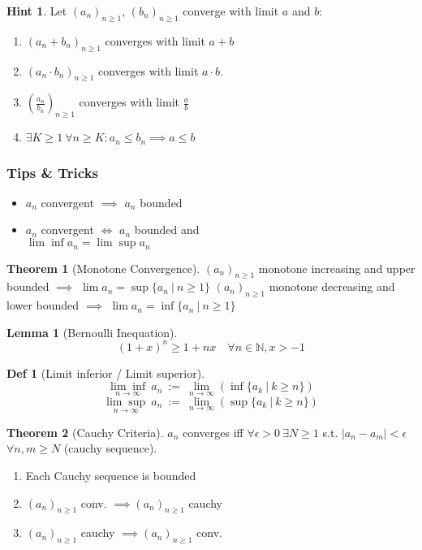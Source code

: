 \documentclass[a4paper, 10pt]{article}
\newtheorem*{lemma}{Lemma}
\theoremstyle{definition}
\newtheorem*{definition}{Def}
\newtheorem*{note_wrapper}{Hint}
\theoremstyle{ex}
\theoremstyle{named}
\newtheorem*{ntheorem_wrapper}{Theorem}
\newenvironment{ntheorem}%
    {\begin{mdframed}[style=important]\begin{ntheorem_wrapper}}%
    {\end{ntheorem_wrapper}\end{mdframed}}
\newenvironment{note}%
    {\begin{mdframed}[style=trick]\begin{note_wrapper}}%
    {\end{note_wrapper}\end{mdframed}}
\newcommand{\N}{\mathbb{N}}
\begin{document}
\begin{note}
    Let $(a_n)_{n\geq1}$, $(b_n)_{n\geq1}$ converge with limit $a$ and $b$:
    \begin{enumerate}
        \item $(a_n + b_n)_{n\geq1}$ converges with limit $a + b$
        \item $(a_n \cdot b_n)_{n\geq1}$ converges with limit $a \cdot b$.
        \item $(\frac{a_n}{b_n})_{n\geq1}$ converges with limit $\frac{a}{b}$
        \item $\exists K \geq 1 \ \forall n \geq K: a_n \leq b_n \implies a \leq b$
    \end{enumerate}
\end{note}

\subsubsection{Tips \& Tricks}
\begin{itemize}
    \item $a_n$ convergent $\implies$ $a_n$ bounded
    \item $a_n$ convergent $\iff$ $a_n$ bounded and \\ 
    $\lim\inf a_n = \lim\sup a_n$
\end{itemize}

\begin{ntheorem}[Monotone Convergence]
    $(a_n)_{n \geq 1}$ monotone increasing and upper bounded $\implies$ $\lim a_n = \sup\{a_n \ | \ n\geq 1\}$ \newline
    $(a_n)_{n \geq 1}$ monotone decreasing and lower bounded $\implies$ $\lim a_n = \inf\{a_n \ | \ n\geq 1\}$
\end{ntheorem}

\begin{lemma}[Bernoulli Inequation]
    $$(1 + x)^n \geq 1 + nx \quad \forall n \in \N, x > -1$$
\end{lemma}

\begin{definition}[Limit inferior / Limit superior]
    $$\underset{n\to\infty}{\lim\inf} \ a_n \ := \ \lim_{n\to\infty} (\inf \{a_k \ | \ k \geq n\})$$
    $$\underset{n\to\infty}{\lim\sup} \ a_n \ := \ \lim_{n\to\infty} (\sup \{a_k \ | \ k \geq n\})$$
\end{definition}

\begin{ntheorem}[Cauchy Criteria]
    $a_n$ converges iff $\forall \epsilon > 0 \ \exists N \geq 1$ s.t. $|a_n - a_m| < \epsilon$ $\forall n,m \geq N$ (cauchy sequence).
    \begin{enumerate}[label=(\roman*)]
        \item Each Cauchy sequence is bounded
        \item $(a_n)_{n \geq 1}$ conv. $\implies (a_n)_{n \geq 1}$ cauchy
        \item $(a_n)_{n \geq 1}$ cauchy $\implies (a_n)_{n \geq 1}$ conv.
    \end{enumerate}
\end{ntheorem}
\end{document}
